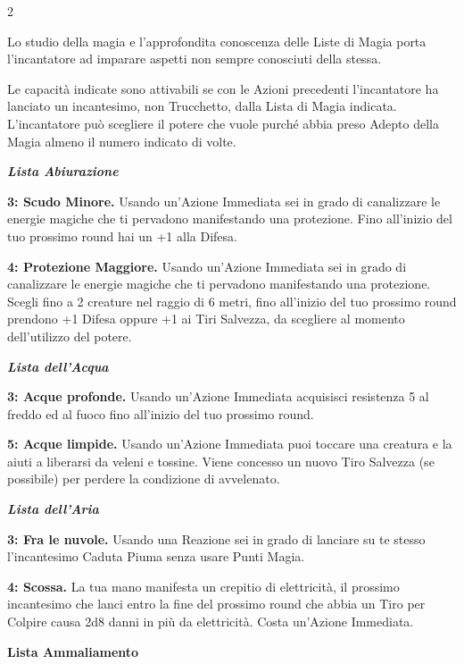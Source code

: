 \begin{multicols}{2}

Lo studio della magia e l'approfondita conoscenza delle Liste di Magia porta l'incantatore ad imparare aspetti non sempre conosciuti della stessa.

Le capacità indicate sono attivabili se con le Azioni precedenti l'incantatore ha lanciato un incantesimo, non Trucchetto, dalla Lista di Magia indicata. L'incantatore può scegliere il potere che vuole purché abbia preso Adepto della Magia almeno il numero indicato di volte.

\emph{\textbf{Lista Abiurazione}}

\textbf{3: Scudo Minore.} Usando un'Azione Immediata sei in grado di canalizzare le energie magiche che ti pervadono manifestando una protezione. Fino all'inizio del tuo prossimo round hai un +1 alla Difesa.

\textbf{4: Protezione Maggiore.} Usando un'Azione Immediata sei in grado di canalizzare le energie magiche che ti pervadono manifestando una protezione. Scegli fino a 2 creature nel raggio di 6 metri, fino all'inizio del tuo prossimo round prendono +1 Difesa oppure +1 ai Tiri Salvezza, da scegliere al momento dell'utilizzo del potere.

\emph{\textbf{Lista dell'Acqua}}

\textbf{3: Acque profonde.} Usando un'Azione Immediata acquisisci resistenza 5 al freddo ed al fuoco fino all'inizio del tuo prossimo round.

\textbf{5: Acque limpide.} Usando un'Azione Immediata puoi toccare una creatura e la aiuti a liberarsi da veleni e tossine. Viene concesso un nuovo Tiro Salvezza (se possibile) per perdere la condizione di avvelenato.

\emph{\textbf{Lista dell'Aria}}

\textbf{3: Fra le nuvole.} Usando una Reazione sei in grado di lanciare su te stesso l'incantesimo Caduta Piuma senza usare Punti Magia.

\textbf{4: Scossa.} La tua mano manifesta un crepitio di elettricità, il prossimo incantesimo che lanci entro la fine del prossimo round che abbia un Tiro per Colpire causa 2d8 danni in più da elettricità. Costa un'Azione Immediata.

\textbf{Lista Ammaliamento}


\end{multicols}

